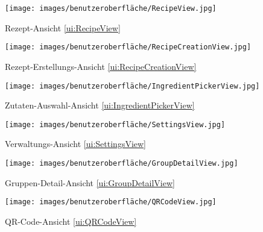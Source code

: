\documentclass[parskip=full]{scrartcl}
\begin{document}
\begin{figure}[htp]
    \begin{minipage}
        [t]{0.49\textwidth}
        \centering
        \texttt{[image: images/benutzeroberfläche/RecipeView.jpg]}
        \caption{Rezept-Ansicht \ref{ui:RecipeView}}
        \label{fig:RecipeView}
    \end{minipage}
    \begin{minipage}
        [t]{0.49\textwidth}
        \centering
        \texttt{[image: images/benutzeroberfläche/RecipeCreationView.jpg]}
        \caption{Rezept-Erstellungs-Ansicht \ref{ui:RecipeCreationView}}
        \label{fig:RecipeCreationView}
    \end{minipage}
\end{figure}
\begin{figure}[htp]
    \begin{minipage}
        [t]{0.49\textwidth}
        \centering
        \texttt{[image: images/benutzeroberfläche/IngredientPickerView.jpg]}
        \caption{Zutaten-Auswahl-Ansicht \ref{ui:IngredientPickerView}}
        \label{fig:IngredientPickerView}
    \end{minipage}
    \begin{minipage}
        [t]{0.49\textwidth}
        \centering
        \texttt{[image: images/benutzeroberfläche/SettingsView.jpg]}
        \caption{Verwaltungs-Ansicht \ref{ui:SettingsView}}
        \label{fig:SettingsView}
    \end{minipage}
\end{figure}
\begin{figure}[htp]
    \begin{minipage}
        [t]{0.49\textwidth}
        \centering
        \texttt{[image: images/benutzeroberfläche/GroupDetailView.jpg]}
        \caption{Gruppen-Detail-Ansicht \ref{ui:GroupDetailView}}
        \label{fig:GroupDetailView}
    \end{minipage}
    \begin{minipage}
        [t]{0.49\textwidth}
        \centering
        \texttt{[image: images/benutzeroberfläche/QRCodeView.jpg]}
        \caption{QR-Code-Ansicht \ref{ui:QRCodeView}}
        \label{fig:QRCodeView}
    \end{minipage}
\end{figure}
\newpage
\renewcommand{\theparagraph}{\arabic{section}.\arabic{subsection}.\arabic{subsubsection}.\arabic{paragraph}}
\setcounter{secnumdepth}{3}
\end{document}
